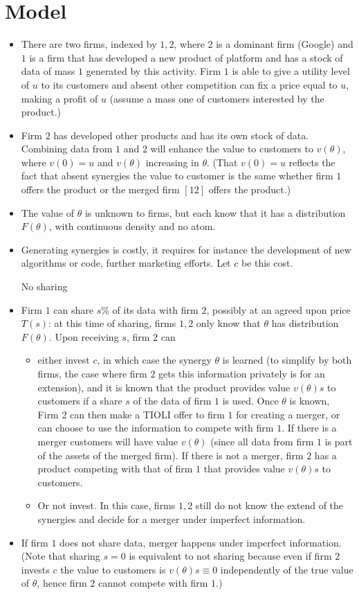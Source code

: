 \documentclass[a4paper,leqno]{article}%
\renewcommand{\t}{\theta}
\begin{document}
\section{Model}
\begin{itemize}
    \item There are two firms, indexed by $1,2$, where $2$ is a dominant firm (Google) and $1$ is a firm that has developed a new product of platform and has a stock of data of mass $1$ generated by this activity. Firm $1$ is able to give a utility level of $u$ to its customers and absent other competition can fix a price equal to $u$, making a profit of $u$ (assume a mass one of customers interested by the product.)
    \item Firm $2$ has developed other products and has its own stock of data. Combining data from $1$ and $2$ will enhance the value to customers to $v(\t)$, where $v(0)=u$ and $v(\t)$ increasing in $\t$. (That $v(0)=u$ reflects the fact that absent synergies the value to customer is the same whether firm $1$ offers the product or the merged firm $[12]$ offers the product.)
    \item The value of $\t$ is unknown to firms, but each know that it has a distribution $F(\t)$, with continuous density and no atom.
    \item Generating synergies is costly, it requires for instance the development of new algorithms or code, further marketing efforts. Let $c$ be this cost. 
    \item [No sharing]
    \item Firm $1$ can share $s\%$ of its data with firm $2$, possibly at an agreed upon price $T(s)$: at this time of sharing, firms $1,2$ only know that $\t$ has distribution $F(\t)$. Upon receiving $s$, firm $2$ can 
    \begin{itemize}
        \item either invest $c$, in which case the synergy $\t$ is learned (to simplify by both firms, the case where firm $2$ gets this information privately is for an extension), and it is known that the product provides value $v(\t)s$ to customers if a share $s$ of the data of firm $1$ is used. Once $\t$ is known, Firm 2 can then make a TIOLI offer to firm $1$ for creating a merger, or can choose to use the information to compete with firm $1$. If there is a merger customers will have value $v(\t)$ (since all data from firm $1$ is part of the assets of the merged firm). If there is not a merger, firm $2$ has a product competing with that of firm $1$ that provides value $v(\t)s$ to customers.
        \item Or not invest. In this case, firms $1,2$ still do not know the extend of the synergies and decide for a merger under imperfect information.
    \end{itemize}
    \item If firm $1$ does not share data, merger happens under imperfect information. (Note that sharing $s=0$ is equivalent to not sharing because even if firm $2$ invests $c$ the value to customers is $v(\t)s\equiv 0$ independently of the true value of $\t$, hence firm $2$ cannot compete with firm $1$.)
\end{itemize}
\end{document}
